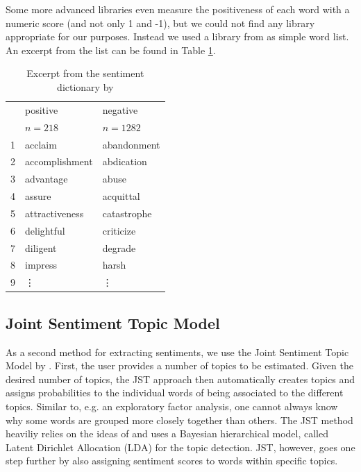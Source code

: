 Some more advanced libraries even measure the positiveness of each word with a numeric score (and not only 1 and -1), but we could not find any library appropriate for our purposes. Instead we used a library from \citet{sent_dictionary} as simple word list. An excerpt from the list can be found in Table \ref{tab:sent_dic}. 
\begin{table}[ht]
\centering
\begin{tabular}{rll}
  \hline
 & positive & negative \\ 
 & $n = 218$ & $n = 1282$ \\ 
  \hline
  1 & acclaim & abandonment \\ 
  2 & accomplishment & abdication \\ 
  3 & advantage & abuse \\ 
  4 & assure & acquittal \\ 
  5 & attractiveness & catastrophe \\ 
  6 & delightful & criticize \\ 
  7 & diligent & degrade \\ 
  8 & impress & harsh \\ 
  9 & \vdots & \vdots \\ 
   \hline
\end{tabular}
\caption{Excerpt from the sentiment dictionary by 
\citet{sent_dictionary}}
\label{tab:sent_dic}
\end{table}

\subsection{Joint Sentiment Topic Model}\label{JST}
As a second method for extracting sentiments, we use the Joint Sentiment Topic Model by \citet{lin2009joint}. First, the user provides a number of topics to be estimated. Given the desired number of topics, the JST approach then automatically creates topics and assigns probabilities to the individual words of being associated to the different topics. Similar to, e.g. an exploratory factor analysis, one cannot always know why some words are grouped more closely together than others. The JST method heaviliy relies on the ideas of \citet{blei2003latent} and uses a Bayesian hierarchical model, called Latent Dirichlet Allocation (LDA) for the topic detection. JST, however, goes one step further by also assigning sentiment scores to words within specific topics. 

